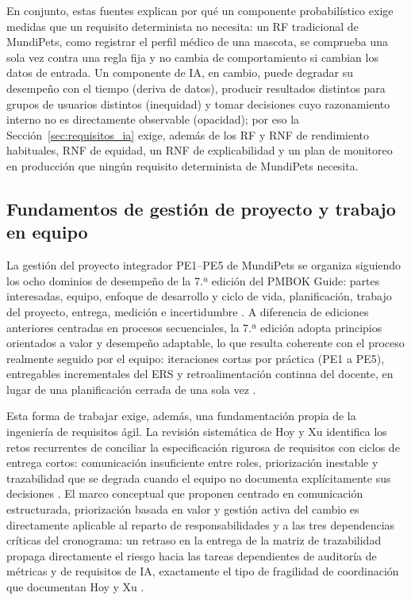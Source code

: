 \documentclass[journal,onecolumn]{IEEEtran}
\begin{document}
	En conjunto, estas fuentes explican por qué un componente probabilístico exige medidas que un
	requisito determinista no necesita: un RF tradicional de MundiPets, como registrar el perfil
	médico de una mascota, se comprueba una sola vez contra una regla fija y no cambia de
	comportamiento si cambian los datos de entrada. Un componente de IA, en cambio, puede degradar
	su desempeño con el tiempo (deriva de datos), producir resultados distintos para grupos de
	usuarios distintos (inequidad) y tomar decisiones cuyo razonamiento interno no es directamente
	observable (opacidad); por eso la Sección~\ref{sec:requisitos_ia} exige, además de los RF y RNF
	de rendimiento habituales, RNF de equidad, un RNF de explicabilidad y un plan de monitoreo en
	producción que ningún requisito determinista de MundiPets necesita.
	
	\subsection*{Fundamentos de gestión de proyecto y trabajo en equipo}
	La gestión del proyecto integrador PE1--PE5 de MundiPets se organiza siguiendo los
	ocho dominios de desempeño de la 7.ª edición del PMBOK Guide: partes interesadas,
	equipo, enfoque de desarrollo y ciclo de vida, planificación, trabajo del proyecto,
	entrega, medición e incertidumbre \cite{pmbok7}. A diferencia de ediciones anteriores
	centradas en procesos secuenciales, la 7.ª edición adopta principios orientados a
	valor y desempeño adaptable, lo que resulta coherente con el proceso realmente
	seguido por el equipo: iteraciones cortas por práctica (PE1 a PE5), entregables
	incrementales del ERS y retroalimentación continua del docente, en lugar de una
	planificación cerrada de una sola vez \cite{pmbok7}.
	
	Esta forma de trabajar exige, además, una fundamentación propia de la ingeniería de
	requisitos ágil. La revisión sistemática de Hoy y Xu identifica los retos recurrentes
	de conciliar la especificación rigurosa de requisitos con ciclos de entrega cortos:
	comunicación insuficiente entre roles, priorización inestable y trazabilidad que se
	degrada cuando el equipo no documenta explícitamente sus decisiones \cite{hoy2023}.
	El marco conceptual que proponen centrado en comunicación estructurada,
	priorización basada en valor y gestión activa del cambio es directamente aplicable
	al reparto de responsabilidades y a las tres dependencias
	críticas del cronograma: un retraso en la entrega de la
	matriz de trazabilidad propaga directamente el riesgo hacia las tareas dependientes
	de auditoría de métricas y de requisitos de IA, exactamente el tipo de fragilidad de
	coordinación que documentan Hoy y Xu \cite{hoy2023}.
	
\end{document}
